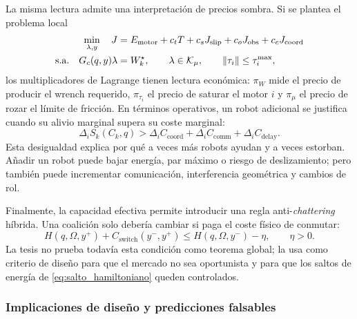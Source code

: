 

La misma lectura admite una interpretación de precios sombra. Si se plantea el problema
local
\begin{align}
  \min_{\lambda,y}\quad
  J &=
  E_{\mathrm{motor}}
  +c_tT+c_sJ_{\mathrm{slip}}
  +c_oJ_{\mathrm{obs}}
  +c_cJ_{\mathrm{coord}} \label{eq:problema_precio_sombra}\\
  \text{s.a.}\quad
  G_c(q,y)\lambda &= W_k^\star,\qquad
  \lambda\in\mathcal{K}_{\mu},\qquad
  \left\|\tau_i\right\|\leq\tau_i^{\max},
  \nonumber
\end{align}
los multiplicadores de Lagrange tienen lectura económica: $\pi_W$ mide el precio de
producir el wrench requerido, $\pi_{\tau_i}$ el precio de saturar el motor $i$ y
$\pi_\mu$ el precio de rozar el límite de fricción. En términos operativos, un robot
adicional se justifica cuando su alivio marginal supera su coste marginal:
\begin{equation}
  \Delta_i S_k(C_k,q)
  >
  \Delta_i C_{\mathrm{coord}}
  +\Delta_i C_{\mathrm{comm}}
  +\Delta_i C_{\mathrm{delay}}.
  \label{eq:regla_marginal_reclutamiento}
\end{equation}
Esta desigualdad explica por qué a veces más robots ayudan y a veces estorban. Añadir un
robot puede bajar energía, par máximo o riesgo de deslizamiento; pero también puede
incrementar comunicación, interferencia geométrica y cambios de rol.

Finalmente, la capacidad efectiva permite introducir una regla anti-\emph{chattering}
híbrida. Una coalición solo debería cambiar si paga el coste físico de conmutar:
\begin{equation}
  H(q,\Omega,y^+)+C_{\mathrm{switch}}(y^-,y^+)
  \leq
  H(q,\Omega,y^-)-\eta,
  \qquad \eta>0 .
  \label{eq:anti_chattering_energia}
\end{equation}
La tesis no prueba todavía esta condición como teorema global; la usa como criterio de
diseño para que el mercado no sea oportunista y para que los saltos de energía de
\eqref{eq:salto_hamiltoniano} queden controlados.

\subsubsection{Implicaciones de diseño y predicciones falsables}
\label{subsubsec:implicaciones_water}


